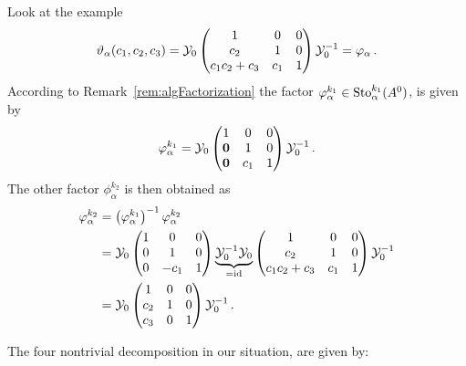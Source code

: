 \begin{exmp}\label{exmp:decompositionHere}
  Look at the example
  \[
    \vartheta_\alpha(c_1,c_2,c_3)=
    \mathcal{Y}_{0}
    \begin{pmatrix} 1 & 0 & 0 \\c_2 & 1 & 0 \\c_1c_2+c_3 & c_1 & 1 \end{pmatrix}
    \mathcal{Y}_{0}^{-1}
    =\varphi_\alpha
    \,.
  \]
  According to Remark~\ref{rem:algFactorization} the factor
  $\varphi_\alpha^{k_1}\in\operatorname{Sto}_\alpha^{k_1}(A^0)$, is given by
  \[
    \varphi_\alpha^{k_1}=
    \mathcal{Y}_{0}
    \begin{pmatrix}
      1 & 0 & 0
    \\\text{\boldmath $0$} & 1 & 0
    \\\text{\boldmath $0$} & c_1 & 1
    \end{pmatrix}
    \mathcal{Y}_{0}^{-1}
    \,.
  \]
  The other factor $\phi_\alpha^{k_2}$ is then obtained as
  \begin{align*}
    \phi_\alpha^{k_2}&=
    \left(\phi_\alpha^{k_1}\right)^{-1}
    \phi_\alpha^{k_2}
  \\&=\cY_{0}
    \begin{pmatrix}
      1     & 0    & 0
    \\0     & 1    & 0
    \\0     & -c_1 & 1
    \end{pmatrix}
    \underset{=\id}{\underbrace{%
        \cY_{0}^{-1}
        \cY_{0}
    }}
    \begin{pmatrix} 1 & 0 & 0 \\c_2 & 1 & 0 \\c_1c_2+c_3 & c_1 & 1 \end{pmatrix}
    \cY_{0}^{-1}
  \\&=\cY_{0}
    \begin{pmatrix}
      1     & 0 & 0
    \\c_2     & 1          & 0
    \\c_3     & 0          & 1
    \end{pmatrix}
    \cY_{0}^{-1}
    \,.
  \end{align*}
\end{exmp}
The four nontrivial decomposition in our situation, are given by:
